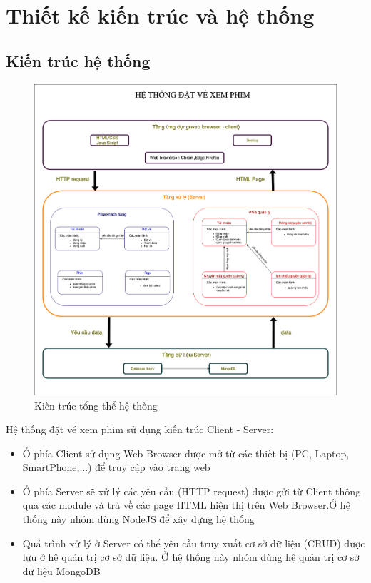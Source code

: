 \documentclass[a4paper, 12pt]{article}
\begin{document}
\section{Thiết kế kiến trúc và hệ thống}

\subsection{Kiến trúc hệ thống}
\begin{figure}[H]
	\begin{center}
		\includegraphics[scale = 0.25]{image/4.1.png}
		\caption{Kiến trúc tổng thể hệ thống}
	\end{center}
\end{figure}

Hệ thống đặt vé xem phim sử dụng kiến trúc Client - Server:
\begin{itemize}
	\item Ở phía Client sử dụng Web Browser được mở từ các thiết bị (PC, Laptop, SmartPhone,...) để truy cập vào trang web
	\item Ở phía Server sẽ xử lý các yêu cầu (HTTP request) được gửi từ Client thông qua các module và trả về các page HTML hiện thị trên Web Browser.Ở hệ thống này nhóm dùng NodeJS để xây dựng hệ thống
	\item Quá trình xử lý ở Server có thể yêu cầu truy xuất cơ sở dữ liệu (CRUD) được lưu ở hệ quản trị cơ sở dữ liệu. Ở hệ thống này nhóm dùng hệ quản trị cơ sở dữ liệu MongoDB
\end{itemize}
\end{document}
